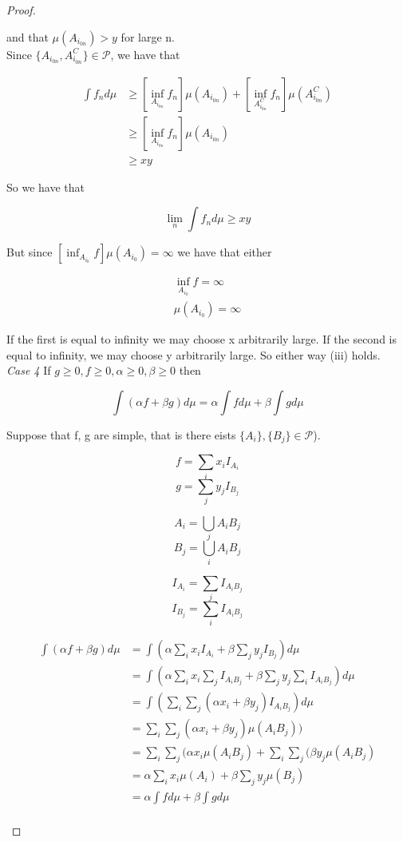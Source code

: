 \documentclass[11pt,fleqn]{book} %
\begin{document}
\begin{proof}
\begin{enumerate}
				and that $\mu(A_{i_{0n}}) > y$ for large n. \\

				Since $\{A_{i_{0n}}, A_{i_{0n}}^C \} \in \mathcal{P}$, we have that



					\begin{align*}
						\int f_n d\mu &\geq [\inf_{A_{i_{0n}}} f_n]\mu(A_{i_{0n}}) + [\inf_{A_{i_{0n}}^C} f_n]\mu(A_{i_{0n}}^C)\\
								&\geq [\inf_{A_{i_{0n}}} f_n]\mu(A_{i_{0n}})\\
								&\geq xy 
					\end{align*}

				So we have that

						$$ \lim_n \int f_n d\mu \geq xy$$


				But since $[\inf_{A_{i_{0}}} f]\mu(A_{i_{0}}) = \infty$ we have that either

						$$\begin{array}{l}
							\inf_{A_{i_{0}}} f  =\infty\\
							\mu(A_{i_0}) = \infty
						\end{array} $$


				If the first is equal to infinity we may choose x arbitrarily large. If the second is equal to infinity, we may choose y arbitrarily large. So either way (iii) holds. \\

				\textit{Case 4} If $g \geq 0, f \geq 0, \alpha \geq 0, \beta \geq 0$ then

						$$\int( \alpha f + \beta g) d\mu = \alpha \int f d\mu + \beta\int g d\mu $$


				Suppose that f, g are simple, that is there eists $\{A_i\}, \{B_j\} \in \mathcal{P}$).

						$$f = \sum_i x_i I_{A_i} $$								
						$$g = \sum_j y_j I_{B_j} $$

						$$A_i = \bigcup_j A_i B_j $$
						$$B_j = \bigcup_i A_i B_j $$

						$$I_{A_i} = \sum_j I_{A_i B_j} $$
						$$I_{B_j} = \sum_i I_{A_i B_j} $$



				\begin{align*}
					\int( \alpha f + \beta g) d\mu &= \int( \alpha \sum_i x_i I_{A_i} + \beta \sum_j y_j I_{B_j}) d\mu\\
							&=\int( \alpha \sum_i x_i \sum_j I_{A_i B_j} + \beta \sum_j y_j \sum_i I_{A_i B_j}) d\mu\\
							&=\int(\sum_i \sum_j (\alpha x_i + \beta y_j)  I_{A_i B_j}) d\mu\\
							&=\sum_i \sum_j (\alpha x_i + \beta y_j)  \mu(A_i B_j))\\
							&=\sum_i \sum_j (\alpha x_i \mu(A_i B_j)
							+ \sum_i \sum_j (\beta y_j  \mu({A_i B_j})\\
							&= \alpha \sum_i x_i \mu(A_i) + \beta \sum_j y_j \mu(B_j)\\
							&=\alpha \int f d\mu + \beta \int g d\mu\\
				\end{align*}


\end{enumerate}
\end{proof}
\end{document}
